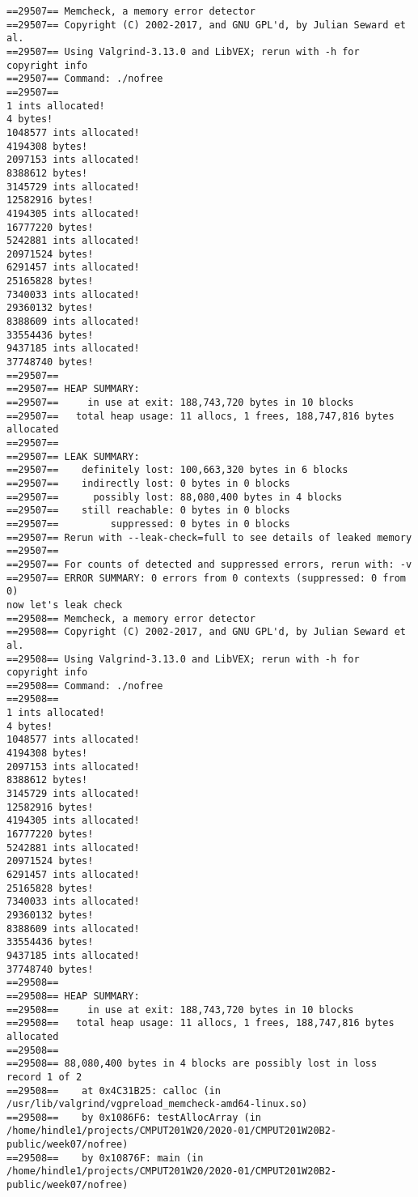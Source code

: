\documentclass[11pt]{article}
\begin{document}
\begin{verbatim}
==29507== Memcheck, a memory error detector
==29507== Copyright (C) 2002-2017, and GNU GPL'd, by Julian Seward et al.
==29507== Using Valgrind-3.13.0 and LibVEX; rerun with -h for copyright info
==29507== Command: ./nofree
==29507== 
1 ints allocated!
4 bytes!
1048577 ints allocated!
4194308 bytes!
2097153 ints allocated!
8388612 bytes!
3145729 ints allocated!
12582916 bytes!
4194305 ints allocated!
16777220 bytes!
5242881 ints allocated!
20971524 bytes!
6291457 ints allocated!
25165828 bytes!
7340033 ints allocated!
29360132 bytes!
8388609 ints allocated!
33554436 bytes!
9437185 ints allocated!
37748740 bytes!
==29507== 
==29507== HEAP SUMMARY:
==29507==     in use at exit: 188,743,720 bytes in 10 blocks
==29507==   total heap usage: 11 allocs, 1 frees, 188,747,816 bytes allocated
==29507== 
==29507== LEAK SUMMARY:
==29507==    definitely lost: 100,663,320 bytes in 6 blocks
==29507==    indirectly lost: 0 bytes in 0 blocks
==29507==      possibly lost: 88,080,400 bytes in 4 blocks
==29507==    still reachable: 0 bytes in 0 blocks
==29507==         suppressed: 0 bytes in 0 blocks
==29507== Rerun with --leak-check=full to see details of leaked memory
==29507== 
==29507== For counts of detected and suppressed errors, rerun with: -v
==29507== ERROR SUMMARY: 0 errors from 0 contexts (suppressed: 0 from 0)
now let's leak check
==29508== Memcheck, a memory error detector
==29508== Copyright (C) 2002-2017, and GNU GPL'd, by Julian Seward et al.
==29508== Using Valgrind-3.13.0 and LibVEX; rerun with -h for copyright info
==29508== Command: ./nofree
==29508== 
1 ints allocated!
4 bytes!
1048577 ints allocated!
4194308 bytes!
2097153 ints allocated!
8388612 bytes!
3145729 ints allocated!
12582916 bytes!
4194305 ints allocated!
16777220 bytes!
5242881 ints allocated!
20971524 bytes!
6291457 ints allocated!
25165828 bytes!
7340033 ints allocated!
29360132 bytes!
8388609 ints allocated!
33554436 bytes!
9437185 ints allocated!
37748740 bytes!
==29508== 
==29508== HEAP SUMMARY:
==29508==     in use at exit: 188,743,720 bytes in 10 blocks
==29508==   total heap usage: 11 allocs, 1 frees, 188,747,816 bytes allocated
==29508== 
==29508== 88,080,400 bytes in 4 blocks are possibly lost in loss record 1 of 2
==29508==    at 0x4C31B25: calloc (in /usr/lib/valgrind/vgpreload_memcheck-amd64-linux.so)
==29508==    by 0x1086F6: testAllocArray (in /home/hindle1/projects/CMPUT201W20/2020-01/CMPUT201W20B2-public/week07/nofree)
==29508==    by 0x10876F: main (in /home/hindle1/projects/CMPUT201W20/2020-01/CMPUT201W20B2-public/week07/nofree)

\end{verbatim}
\end{document}
